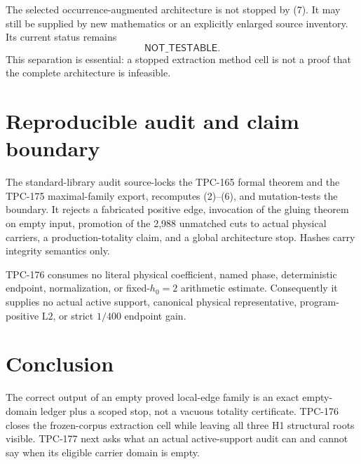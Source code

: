 \documentclass[11pt]{article}
\theoremstyle{definition}
\theoremstyle{remark}
\newcommand{\Ltwo}{\mathrm{L2}}
\begin{document}
The selected occurrence-augmented architecture is not stopped by
(7).  It may still be supplied by new mathematics or an explicitly
enlarged source inventory.  Its current status remains
\[
 \mathsf{NOT\_TESTABLE}.                                          \tag{8}
\]
This separation is essential: a stopped extraction method cell is
not a proof that the complete architecture is infeasible.

\section{Reproducible audit and claim boundary}

The standard-library audit source-locks the TPC-165 formal theorem
and the TPC-175 maximal-family export, recomputes (2)--(6), and
mutation-tests the boundary.  It rejects a fabricated positive edge,
invocation of the gluing theorem on empty input, promotion of the
2,988 unmatched cuts to actual physical carriers, a production-totality
claim, and a global architecture stop.  Hashes carry integrity
semantics only.

TPC-176 consumes no literal physical coefficient, named phase,
deterministic endpoint, normalization, or fixed-\(h_0=2\) arithmetic
estimate.  Consequently it supplies no actual active support,
canonical physical representative, program-positive \(\Ltwo\), or
strict \(1/400\) endpoint gain.

\section{Conclusion}

The correct output of an empty proved local-edge family is an exact
empty-domain ledger plus a scoped stop, not a vacuous totality
certificate.  TPC-176 closes the frozen-corpus extraction cell while
leaving all three H1 structural roots visible.  TPC-177 next asks
what an actual active-support audit can and cannot say when its
eligible carrier domain is empty.

\nocite{*}


\end{document}
